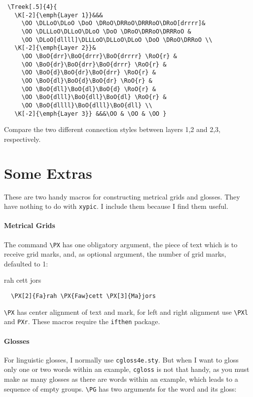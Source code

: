 \documentclass[12pt,a4paper]{article}
\begin{document}
\begin{verbatim}
 \Treek[.5]{4}{
   \K[-2]{\emph{Layer 1}}&&& 
     \OO \DLLoO\DLoO \DoO \DRoO\DRRoO\DRRRoO\DRoO[drrrr]& 
     \OO \DLLLoO\DLLoO\DLoO \DoO \DRoO\DRRoO\DRRRoO & 
     \OO \DLoO[dllll]\DLLLoO\DLLoO\DLoO \DoO \DRoO\DRRoO \\ 
   \K[-2]{\emph{Layer 2}}& 
     \OO \BoO{drr}\BoO{drrr}\BoO{drrrr} \RoO{r} & 
     \OO \BoO{dr}\BoO{drr}\BoO{drrr} \RoO{r} & 
     \OO \BoO{d}\BoO{dr}\BoO{drr} \RoO{r} & 
     \OO \BoO{dl}\BoO{d}\BoO{dr} \RoO{r} & 
     \OO \BoO{dll}\BoO{dl}\BoO{d} \RoO{r} & 
     \OO \BoO{dlll}\BoO{dll}\BoO{dl} \RoO{r} & 
     \OO \BoO{dllll}\BoO{dlll}\BoO{dll} \\
   \K[-2]{\emph{Layer 3}} &&&\OO & \OO & \OO } 
\end{verbatim}
 
Compare the two different connection styles between layers 1,2 and 2,3,
respectively. 




\section{Some Extras}
\label{sec:extras}

These are two handy macros for constructing metrical grids and glosses. They
have nothing to do with \texttt{xypic}. I include them because I find them
useful. 

\paragraph{Metrical Grids}

The command \verb|\PX| has one obligatory argument, the piece of text which is
to receive grid marks, and, as optional argument, the number of grid marks,
defaulted to 1:

\begin{minipage}[t]{4cm}
  rah cett jors
\end{minipage}
\begin{minipage}[t]{5cm}
\begin{verbatim}
  \PX[2]{Fa}rah \PX{Faw}cett \PX[3]{Ma}jors
\end{verbatim}
\end{minipage}

\verb|\PX| has center alignment of text and mark, for left and right alignment
use \verb|\PXl| and \verb|PXr|. These macros require the \texttt{ifthen}
package. 


\paragraph{Glosses}
For linguistic glosses, I normally use \texttt{cgloss4e.sty}. But when I want to
gloss only one or two words within an example, \texttt{cgloss} is not that
handy, as you must make as many glosses as there are words within an example,
which leads to a sequence of empty groups. \verb|\PG| has two arguments for the
word and its gloss:
\end{document}
